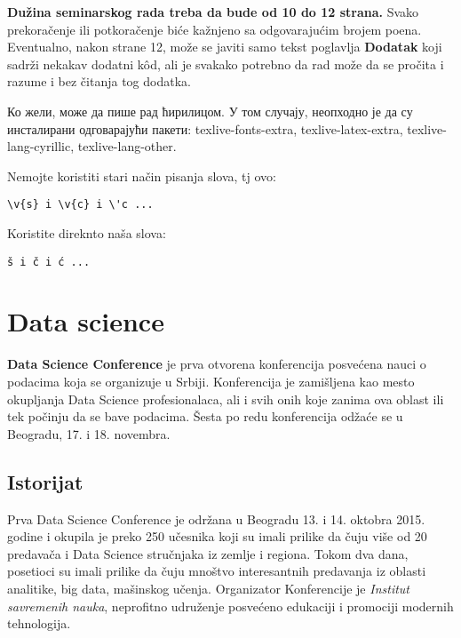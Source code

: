 \documentclass[a4paper]{article}
\begin{document}
\textbf{Dužina seminarskog rada treba da bude od 10 do 12 strana.} Svako prekoračenje ili potkoračenje biće kažnjeno sa odgovarajućim brojem poena. Eventualno, nakon strane 12, može se javiti samo tekst poglavlja \textbf{Dodatak} koji sadrži nekakav dodatni k\^{o}d, ali je svakako potrebno da rad može da se pročita i razume i bez čitanja tog dodatka. 

Ко жели, може да пише рад ћирилицом. У том случају, неопходно је да су инсталирани одговарајући пакети: texlive-fonts-extra, texlive-latex-extra, texlive-lang-cyrillic, texlive-lang-other. 

Nemojte koristiti stari način pisanja slova, tj ovo:
\begin{verbatim}
\v{s} i \v{c} i \'c ...
\end{verbatim}
Koristite direknto naša slova:	
\begin{verbatim}
š i č i ć ... 
\end{verbatim}


\section{Data science}
\textbf{Data Science Conference} je prva otvorena konferencija posvećena nauci o podacima koja se organizuje u Srbiji. Konferencija je zamišljena kao mesto okupljanja Data Science profesionalaca, ali i svih onih koje zanima ova oblast ili tek počinju da se bave podacima. Šesta po redu konferencija odžaće se u Beogradu, 17. i 18. novembra.
\subsection{Istorijat}
 
Prva Data Science Conference je održana u Beogradu 13. i 14. oktobra 2015. godine i okupila je preko 250 učesnika koji su imali prilike da čuju više od 20 predavača i Data Science stručnjaka iz zemlje i regiona. Tokom dva dana, posetioci su imali prilike da čuju mnoštvo interesantnih predavanja iz oblasti analitike, big data, mašinskog učenja. Organizator Konferencije je \textit{Institut savremenih nauka}, neprofitno udruženje posvećeno edukaciji i promociji modernih tehnologija.
\end{document}
